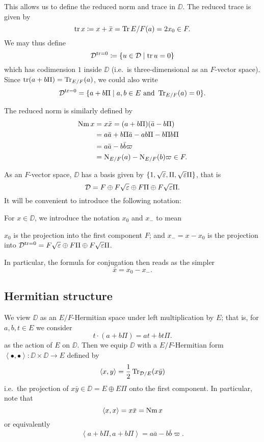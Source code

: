 This allows us to define the reduced norm and trace in $\DD$.
The reduced trace is given by
\[ \operatorname{tr} x \coloneqq x + \bar x = \operatorname{Tr}{E/F}(a) = 2x_0 \in F. \]
We may thus define
\[ \mathcal D^{\operatorname{tr} = 0} \coloneqq \left\{ u \in \mathcal D \mid \operatorname{tr} u = 0 \right\} \]
which has codimension $1$ inside $\DD$ (i.e.\ is three-dimensional as an $F$-vector space).
Since $\operatorname{tr}(a+b\Pi) = \operatorname{Tr}_{E/F}(a)$, we could also write
\[ \mathcal D^{\operatorname{tr} = 0} = \{ a+b\Pi \mid a,b \in E \text{ and } \operatorname{Tr}_{E/F}(a) = 0 \}. \]

The reduced norm is similarly defined by
\begin{align*}
  \operatorname{Nm} x &= x \bar x = (a + b \Pi)(\bar a - b \Pi) \\
  &= a \bar a + b \Pi \bar a - a b \Pi - b \Pi b \Pi \\
  &= a \bar a - b \bar b \varpi \\
  &= \operatorname{N}_{E/F}(a) - \operatorname{N}_{E/F}(b) \varpi \in F.
\end{align*}

As an $F$-vector space, $\DD$ has a basis given by
$\{1, \sqrt{\varepsilon}, \Pi, \sqrt{\varepsilon}\Pi\}$, that is
\[ \mathcal D = F \oplus F\sqrt{\varepsilon} \oplus F \Pi \oplus F\sqrt{\varepsilon}\Pi. \]
It will be convenient to introduce the following notation:
\begin{definition}
  [$x_0$ and $x_-$]
  For $x \in \DD$, we introduce the notation $x_0$ and $x_-$ to mean
  \begin{itemize}
    \ii $x_0$ is the projection into the first component $F$; and
    \ii $x_- = x - x_0$ is the projection into
    $\mathcal D^{\operatorname{tr} = 0} = F\sqrt{\varepsilon} \oplus F \Pi \oplus F\sqrt{\varepsilon}\Pi$.
  \end{itemize}
\end{definition}
In particular, the formula for conjugation then reads as the simpler
\[ \bar x = x_0 - x_-. \]

\subsection{Hermitian structure}
We view $\DD$ as an $E/F$-Hermitian space under left multiplication by $E$;
that is, for $a,b,t \in E$ we consider
\[ t \cdot (a + b \Pi) = a t + b t \Pi. \]
as the action of $E$ on $\DD$.
Then we equip $\DD$ with a $E/F$-Hermitian form
$\left\langle \bullet, \bullet \right\rangle \colon \DD \times \DD \to E$
defined by
\[ \left\langle x,y \right\rangle = \frac{1}{2} \operatorname{Tr}_{\mathcal D/E}(x \bar y) \]
i.e.\ the projection of $x \bar y \in \DD = E \oplus E\Pi$ onto the first component.
In particular, note that
\[ \left\langle x,x \right\rangle = x \bar{x} = \operatorname{Nm} x \]
or equivalently
\[ \left\langle a+b\Pi, a+b\Pi \right\rangle = a \bar a - b \bar b \varpi. \]

